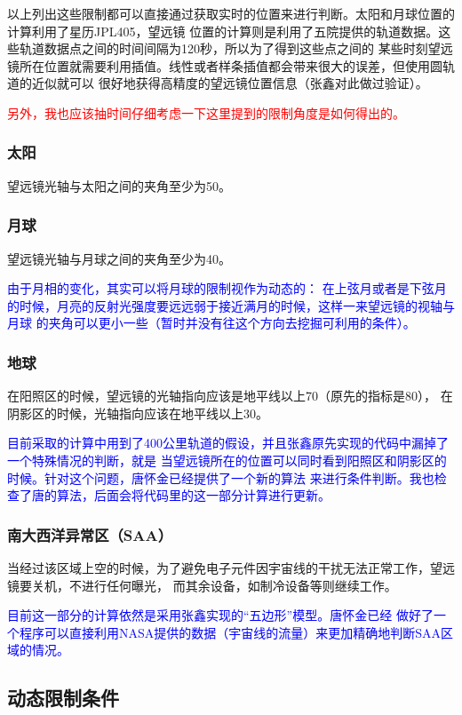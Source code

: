 \documentclass[a4paper,11pt]{ctexart}
\newcommand{\RT}[1]{\textcolor{red}{#1}}
\newcommand{\BT}[1]{\textcolor{blue}{#1}}
\begin{document}
以上列出这些限制都可以直接通过获取实时的位置来进行判断。太阳和月球位置的计算利用了星历JPL405，望远镜
位置的计算则是利用了五院提供的轨道数据。这些轨道数据点之间的时间间隔为120秒，所以为了得到这些点之间的
某些时刻望远镜所在位置就需要利用插值。线性或者样条插值都会带来很大的误差，但使用圆轨道的近似就可以
很好地获得高精度的望远镜位置信息（张鑫对此做过验证）。

\RT{另外，我也应该抽时间仔细考虑一下这里提到的限制角度是如何得出的。}

\subsubsection{太阳}
望远镜光轴与太阳之间的夹角至少为50\textdegree 。

\subsubsection{月球}
望远镜光轴与月球之间的夹角至少为40\textdegree 。

\BT{\heiti 由于月相的变化，其实可以将月球的限制视作为动态的：
在上弦月或者是下弦月的时候，月亮的反射光强度要远远弱于接近满月的时候，这样一来望远镜的视轴与月球
的夹角可以更小一些（暂时并没有往这个方向去挖掘可利用的条件）。}

\subsubsection{地球}
在阳照区的时候，望远镜的光轴指向应该是地平线以上70\textdegree（原先的指标是80\textdegree），
在阴影区的时候，光轴指向应该在地平线以上30\textdegree 。

\BT{目前采取的计算中用到了400公里轨道的假设，并且张鑫原先实现的代码中漏掉了一个特殊情况的判断，就是
当望远镜所在的位置可以同时看到阳照区和阴影区的时候。针对这个问题，唐怀金已经提供了一个新的算法
来进行条件判断。我也检查了唐的算法，后面会将代码里的这一部分计算进行更新。}

\subsubsection{南大西洋异常区（SAA）}
当经过该区域上空的时候，为了避免电子元件因宇宙线的干扰无法正常工作，望远镜要关机，不进行任何曝光，
而其余设备，如制冷设备等则继续工作。

\BT{目前这一部分的计算依然是采用张鑫实现的“五边形”模型。唐怀金已经
做好了一个程序可以直接利用NASA提供的数据（宇宙线的流量）来更加精确地判断SAA区域的情况。}


\subsection{动态限制条件}
\end{document}
